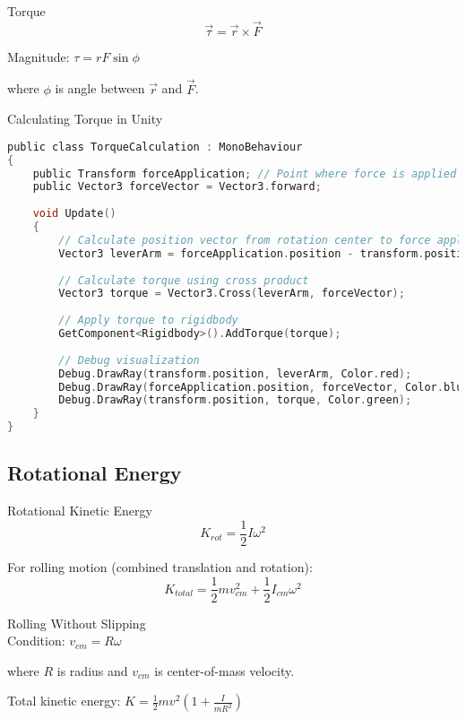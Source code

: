 \begin{definition}{Torque}\\
    $$\vec{\tau} = \vec{r} \times \vec{F}$$
    
    Magnitude: $\tau = rF\sin\phi$
    
    where $\phi$ is angle between $\vec{r}$ and $\vec{F}$.
\end{definition}

\begin{code}{Calculating Torque in Unity}\\
\begin{lstlisting}[language=C, style=basesmol]
public class TorqueCalculation : MonoBehaviour 
{
    public Transform forceApplication; // Point where force is applied
    public Vector3 forceVector = Vector3.forward;
    
    void Update() 
    {
        // Calculate position vector from rotation center to force application
        Vector3 leverArm = forceApplication.position - transform.position;
        
        // Calculate torque using cross product
        Vector3 torque = Vector3.Cross(leverArm, forceVector);
        
        // Apply torque to rigidbody
        GetComponent<Rigidbody>().AddTorque(torque);
        
        // Debug visualization
        Debug.DrawRay(transform.position, leverArm, Color.red);
        Debug.DrawRay(forceApplication.position, forceVector, Color.blue);
        Debug.DrawRay(transform.position, torque, Color.green);
    }
}
\end{lstlisting}
\end{code}

\subsection{Rotational Energy}

\begin{definition}{Rotational Kinetic Energy}\\
    $$K_{rot} = \frac{1}{2}I\omega^2$$
    
    For rolling motion (combined translation and rotation):
    $$K_{total} = \frac{1}{2}mv_{cm}^2 + \frac{1}{2}I_{cm}\omega^2$$
\end{definition}

\begin{concept}{Rolling Without Slipping}\\
    Condition: $v_{cm} = R\omega$
    
    where $R$ is radius and $v_{cm}$ is center-of-mass velocity.
    
    Total kinetic energy: $K = \frac{1}{2}mv^2(1 + \frac{I}{mR^2})$
\end{concept}

